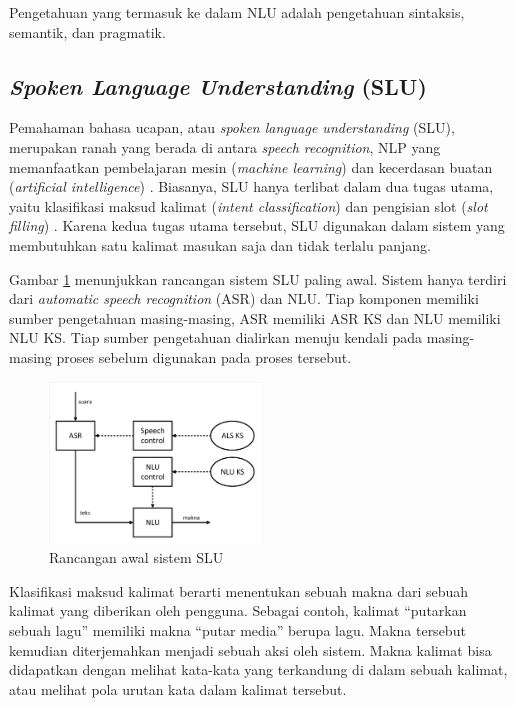 Pengetahuan yang termasuk ke dalam NLU adalah pengetahuan sintaksis, semantik, dan pragmatik.

\subsection{\textit{Spoken Language Understanding} (SLU)}

Pemahaman bahasa ucapan, atau \textit{spoken language understanding} (SLU), merupakan ranah yang berada di antara \textit{speech recognition}, NLP yang memanfaatkan pembelajaran mesin (\textit{machine learning}) dan kecerdasan buatan (\textit{artificial intelligence}) \parencite{tur2011spoken}. Biasanya, SLU hanya terlibat dalam dua tugas utama, yaitu klasifikasi maksud kalimat (\textit{intent classification}) dan pengisian slot (\textit{slot filling}) \parencite{goo2018slot}. Karena kedua tugas utama tersebut, SLU digunakan dalam sistem yang membutuhkan satu kalimat masukan saja dan tidak terlalu panjang.

Gambar \ref{fig:slu_early} menunjukkan rancangan sistem SLU paling awal. Sistem hanya terdiri dari \textit{automatic speech recognition} (ASR) dan NLU. Tiap komponen memiliki sumber pengetahuan masing-masing, ASR memiliki ASR KS dan NLU memiliki NLU KS. Tiap sumber pengetahuan dialirkan menuju kendali pada masing-masing proses sebelum digunakan pada proses tersebut.

\begin{figure}[H]
	\centering
	\includegraphics[width=0.5\textwidth, trim=2 2 2 2, clip]{resources/2/early_slu.pdf}
	\caption{Rancangan awal sistem SLU \parencite{tur2011spoken}}
	\label{fig:slu_early}
\end{figure}

Klasifikasi maksud kalimat berarti menentukan sebuah makna dari sebuah kalimat yang diberikan oleh pengguna. Sebagai contoh, kalimat “putarkan sebuah lagu” memiliki makna “putar media” berupa lagu. Makna tersebut kemudian diterjemahkan menjadi sebuah aksi oleh sistem. Makna kalimat bisa didapatkan dengan melihat kata-kata yang terkandung di dalam sebuah kalimat, atau melihat pola urutan kata dalam kalimat tersebut.

